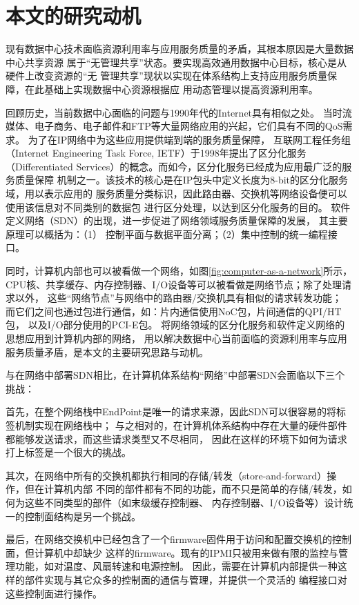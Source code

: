\section{本文的研究动机}

现有数据中心技术面临资源利用率与应用服务质量的矛盾，其根本原因是大量数据中心共享资源
属于“无管理共享”状态。要实现高效通用数据中心目标，核心是从硬件上改变资源的“无
管理共享”现状以实现在体系结构上支持应用服务质量保障，在此基础上实现数据中心资源根据应
用动态管理以提高资源利用率。

回顾历史，当前数据中心面临的问题与1990年代的Internet具有相似之处。
当时流媒体、电子商务、电子邮件和FTP等大量网络应用的兴起，它们具有不同的QoS需求。
为了在IP网络中为这些应用提供端到端的服务质量保障，
互联网工程任务组（Internet Engineering Task Force, IETF）于1998年提出了区分化服务
（Differentiated Services）的概念。而如今，区分化服务已经成为应用最广泛的服务质量保障
机制之一。该技术的核心是在IP包头中定义长度为8-bit的区分化服务域，用以表示应用的
服务质量分类标识，因此路由器、交换机等网络设备便可以使用该信息对不同类别的数据包
进行区分处理，以达到区分化服务的目的。
软件定义网络（SDN）的出现，进一步促进了网络领域服务质量保障的发展，
其主要原理可以概括为：（1） 控制平面与数据平面分离；（2）集中控制的统一编程接口。

同时，计算机内部也可以被看做一个网络，如图\ref{fig:computer-as-a-network}所示，
CPU核、共享缓存、内存控制器、I/O设备等可以被看做是网络节点；除了处理请求以外，
这些“网络节点”与网络中的路由器/交换机具有相似的请求转发功能；
而它们之间也通过包进行通信，如：片内通信使用NoC包，片间通信的QPI/HT包，
以及I/O部分使用的PCI-E包。
将网络领域的区分化服务和软件定义网络的思想应用到计算机内部的网络，
用以解决数据中心当前面临的资源利用率与应用服务质量矛盾，是本文的主要研究思路与动机。

与在网络中部署SDN相比，在计算机体系结构“网络”中部署SDN会面临以下三个挑战：

首先，在整个网络栈中EndPoint是唯一的请求来源，因此SDN可以很容易的将标签机制实现在网络栈中；
与之相对的，在计算机体系结构中存在大量的硬件部件都能够发送请求，而这些请求类型又不尽相同，
因此在这样的环境下如何为请求打上标签是一个很大的挑战。

其次，在网络中所有的交换机都执行相同的存储/转发（store-and-forward）操作，但在计算机内部
不同的部件都有不同的功能，而不只是简单的存储/转发，如何为这些不同类型的部件（如末级缓存控制器、
内存控制器、I/O设备等）设计统一的控制面结构是另一个挑战。

最后，在网络交换机中已经包含了一个firmware固件用于访问和配置交换机的控制面，但计算机中却缺少
这样的firmware。现有的IPMI只被用来做有限的监控与管理功能，如对温度、风扇转速和电源控制。
因此，需要在计算机内部提供一种这样的部件实现与其它众多的控制面的通信与管理，并提供一个灵活的
编程接口对这些控制面进行操作。



